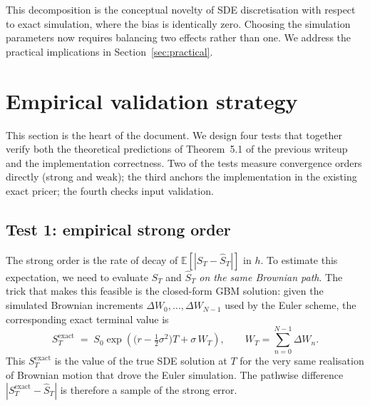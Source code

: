 \documentclass[11pt,a4paper]{article}
\theoremstyle{plain}
\theoremstyle{definition}
\theoremstyle{remark}
\newcommand{\E}{\mathbb{E}}
\begin{document}
This decomposition is the conceptual novelty of SDE discretisation with
respect to exact simulation, where the bias is identically zero. Choosing
the simulation parameters now requires balancing two effects rather
than one. We address the practical implications in
Section~\ref{sec:practical}.

\section{Empirical validation strategy}
\label{sec:validation}

This section is the heart of the document. We design four tests that
together verify both the theoretical predictions of
Theorem~5.1 of the previous writeup and the implementation
correctness. Two of the tests measure convergence orders directly
(strong and weak); the third anchors the implementation in the
existing exact pricer; the fourth checks input validation.

\subsection{Test 1: empirical strong order}

The strong order is the rate of decay of $\E[|S_T - \hat S_T|]$ in
$h$. To estimate this expectation, we need to evaluate $S_T$ and
$\hat S_T$ \emph{on the same Brownian path}. The trick that makes this
feasible is the closed-form GBM solution: given the simulated
Brownian increments $\Delta W_0, \ldots, \Delta W_{N-1}$ used by the
Euler scheme, the corresponding exact terminal value is
\begin{equation}
\label{eq:exact-from-W}
S_T^{\mathrm{exact}} \;=\; S_0 \exp\!\left(
\big(r - \tfrac{1}{2}\sigma^2\big) T + \sigma\, W_T
\right),
\qquad
W_T = \sum_{n=0}^{N-1} \Delta W_n.
\end{equation}
This $S_T^{\mathrm{exact}}$ is the value of the true SDE solution at
$T$ for the very same realisation of Brownian motion that drove the
Euler simulation. The pathwise difference $|S_T^{\mathrm{exact}} -
\hat S_T|$ is therefore a sample of the strong error.
\end{document}
